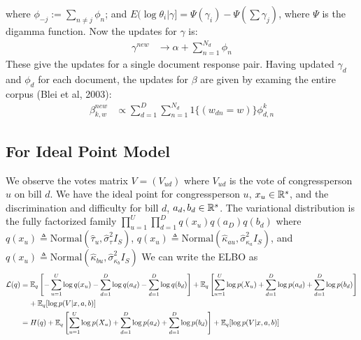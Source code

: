 \documentclass{article}
\begin{document}
where $\phi_{-j} := \sum_{n\not=j} \phi_n$; and $E(\log \theta_i | \gamma] = \Psi(\gamma_i) - \Psi(\sum \gamma_j)$, where $\Psi$ is the digamma function. Now the updates for $\gamma$ is: 
\begin{align*}
\gamma^{new} &\rightarrow \alpha + \sum_{n=1}^{N_d} \phi_n 
\end{align*}
These give the updates for a single document response pair. Having updated $\gamma_d$ and $\phi_d$ for each document, the updates for $\beta$ are given by examing the entire corpus (Blei et al, 2003): 
\begin{align*}
\beta^{new}_{k,w} &\propto \sum_{d=1}^D \sum_{n=1}^{N_d} 1\{(w_{dn} = w)\} \phi^k_{d,n}
\end{align*}

\newpage


\subsection{For Ideal Point Model}
We observe the votes matrix $V = (V_{ud})$ where $V_{ud}$ is the vote of congressperson $u$ on bill $d$. We have the ideal point for congressperson $u$, $x_u \in \mathbb{R}^s$, and the discrimination and difficulty for bill $d$, $a_d,b_d \in \mathbb{R}^s$. The variational distribution is the fully factorized family $\prod_{u=1}^U \prod_{d=1}^D q(x_u)q(a_D)q(b_d)$ where $q(x_u) \triangleq \text{Normal}(\hat{\tau}_u, \hat{\sigma}^2_\tau I_S)$, $q(x_u) \triangleq \text{Normal}(\hat{\kappa}_{au}, \hat{\sigma}^2_{\kappa_a} I_S)$, and $q(x_u) \triangleq \text{Normal}(\hat{\kappa}_{bu}, \hat{\sigma}^2_{\kappa_b} I_S)$
\vskip 10pt
We can write the ELBO as 
\begin{align*}
\mathcal{L}(q) & = \mathbb{E}_q\left[-\sum_{u=1}^U\log q(x_u) - \sum_{d=1}^D \log q(a_d) - \sum_{d=1}^D \log q(b_d)\right] + \mathbb{E}_q\left[\sum_{u=1}^U \log p(X_{u}) +\sum_{d=1}^D \log p(a_d) + \sum_{d=1}^D \log p(b_d)\right]\\
& \;\;\;\; + \mathbb{E}_q[\log p(V|x,a,b)]\\
& = H(q) +  \mathbb{E}_q\left[\sum_{u=1}^U \log p(X_{u}) +\sum_{d=1}^D \log p(a_d) + \sum_{d=1}^D \log p(b_d)\right] + \mathbb{E}_q[\log p(V|x,a,b)]\\
\end{align*}
\end{document}
